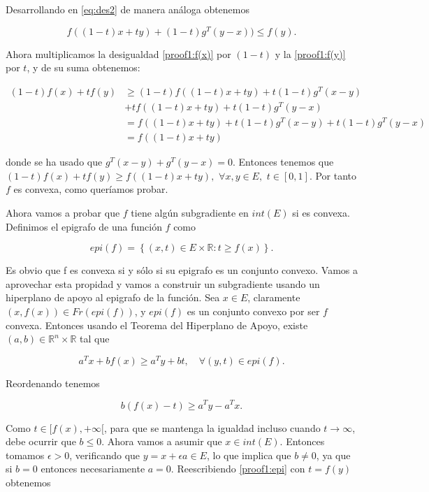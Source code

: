 Desarrollando en \ref{eq:des2} de manera análoga obtenemos

\begin{equation}\label{proof1:f(y)}
    f((1-t)x + ty) + (1-t)g^T(y-x)) \leq f(y).
\end{equation}

Ahora multiplicamos la desigualdad \ref{proof1:f(x)} por $(1-t)$ y la \ref{proof1:f(y)} por $t$, y de su suma obtenemos:

\begin{align*}
	(1-t)f(x) + tf(y) &\geq  (1-t)f((1-t)x+ty) + t(1-t)g^T(x-y) \\
	&+ tf((1-t)x+ty) + t(1-t)g^T(y-x) \\
	 &= f((1-t)x + ty) + t(1-t) g^T(x-y) + t(1-t)g^T(y-x) \\
	&= f((1-t)x+ty)
\end{align*}

donde se ha usado que $g^T(x-y) + g^T(y-x)=0$. Entonces tenemos que $(1-t)f(x) + tf(y) \geq f((1-t)x + ty), $ $ \forall x,y \in E, $ $ t \in [0,1]$. Por tanto $f$ es convexa, como queríamos probar.

Ahora vamos a probar que $f$ tiene algún subgradiente en $int(E)$ si es convexa. Definimos el epigrafo de una función $f$ como

 $$epi(f)=\left \{ (x,t) \in E \times \mathbb{R} : t \geq f(x) \right \}.$$

Es obvio que f es convexa si y sólo si su epigrafo es un conjunto convexo. Vamos a aprovechar esta propidad y vamos a construir un subgradiente usando un hiperplano de apoyo al epigrafo de la función. Sea $x \in E$, claramente $(x, f(x)) \in Fr(epi(f))$, y $epi(f)$ es un conjunto convexo por ser $f$ convexa. Entonces usando el Teorema del Hiperplano de Apoyo, existe $(a,b) \in \mathbb{R}^n \times \mathbb{R}$ tal que

\begin{equation}\label{proof1:epi}
    a^Tx + bf(x) \geq a^Ty + bt, \quad \forall (y,t) \in epi(f).
\end{equation}

Reordenando tenemos

$$b(f(x)-t) \geq a^Ty - a^Tx.$$

Como $t \in [f(x), + \infty [$, para que se mantenga la igualdad incluso cuando $t \rightarrow \infty$, debe ocurrir que $b\leq 0$. Ahora vamos a asumir que $x \in int(E)$. Entonces tomamos $\epsilon > 0$, verificando que $y=x+\epsilon a \in E$, lo que implica que $b\neq 0$, ya que si $b=0$ entonces necesariamente $a=0$. Reescribiendo \ref{proof1:epi} con $t=f(y)$ obtenemos

